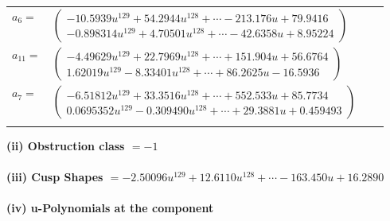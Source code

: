 \documentclass[1p]{elsarticle_modified}
\theoremstyle{definition}
\begin{document}
\begin{tabular}{m{7pt} m{180pt} m{7pt} m{180pt} }
\flushright $a_{6}=$&$\begin{pmatrix}-10.5939 u^{129}+54.2944 u^{128}+\cdots-213.176 u+79.9416\\-0.898314 u^{129}+4.70501 u^{128}+\cdots-42.6358 u+8.95224\end{pmatrix}$ \\
\flushright $a_{11}=$&$\begin{pmatrix}-4.49629 u^{129}+22.7969 u^{128}+\cdots+151.904 u+56.6764\\1.62019 u^{129}-8.33401 u^{128}+\cdots+86.2625 u-16.5936\end{pmatrix}$ \\
\flushright $a_{7}=$&$\begin{pmatrix}-6.51812 u^{129}+33.3516 u^{128}+\cdots+552.533 u+85.7734\\0.0695352 u^{129}-0.309490 u^{128}+\cdots+29.3881 u+0.459493\end{pmatrix}$\\&\end{tabular}
\flushleft \textbf{(ii) Obstruction class $= -1$}\\~\\
\flushleft \textbf{(iii) Cusp Shapes $= -2.50096 u^{129}+12.6110 u^{128}+\cdots-163.450 u+16.2890$}\\~\\
\newpage\renewcommand{\arraystretch}{1}
\flushleft \textbf{(iv) u-Polynomials at the component}\newline \\
\end{document}
